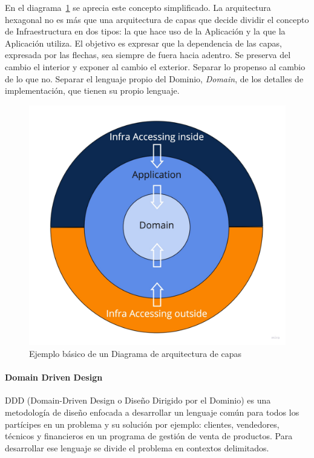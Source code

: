 En el diagrama~\cref{fig:layers} se aprecia este concepto simplificado.
La arquitectura hexagonal no es más que una arquitectura de capas que decide dividir el concepto de Infraestructura en dos tipos: la que hace uso de la Aplicación y la que la Aplicación utiliza.
El objetivo es expresar que la dependencia de las capas, expresada por las flechas, sea siempre de fuera hacia adentro.
Se preserva del cambio el interior y exponer al cambio el exterior.
Separar lo propenso al cambio de lo que no.
Separar el lenguaje propio del Dominio, \textit{Domain}, de los detalles de implementación, que tienen su propio lenguaje.

\begin{figure}[H]
    \centering
    \includegraphics[height=0.22\textheight]{./part/Proyecto_ejecutivo/memoria_descriptiva/infoPreviaAntecedentes/img/PFM - Layer}
    \caption{Ejemplo básico de un Diagrama de arquitectura de capas}\label{fig:layers}
\end{figure}

\paragraph{Domain Driven Design}

\gls{DDD} (Domain-Driven Design o Diseño Dirigido por el Dominio) es una metodología de diseño enfocada a desarrollar un lenguaje común para todos los partícipes en un problema y su solución por ejemplo: clientes, vendedores, técnicos y financieros en un programa de gestión de venta de productos.
Para desarrollar ese lenguaje se divide el problema en contextos delimitados.

